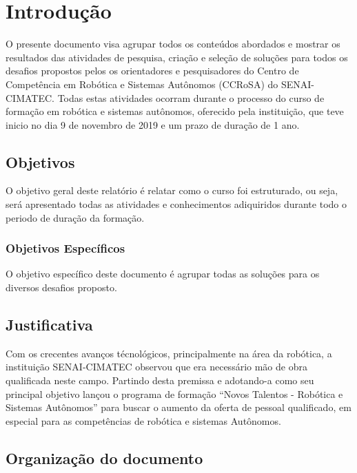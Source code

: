 \chapter{Introdução}
\label{chap:intro}

O presente documento visa agrupar todos os conteúdos abordados e mostrar os resultados das atividades de pesquisa, criação e seleção de soluções para todos os desafios propostos pelos os orientadores e pesquisadores do Centro de Competência em Robótica e Sistemas Autônomos (CCRoSA) do SENAI-CIMATEC. Todas estas atividades ocorram durante o processo do curso de formação em robótica e sistemas autônomos, oferecido pela instituição, que teve inicio no dia 9 de novembro de 2019 e um prazo de duração de 1 ano.



\section{Objetivos}
\label{sec:obj}

O objetivo geral deste relatório é relatar como o curso foi estruturado, ou seja, será apresentado todas as atividades e conhecimentos adiquiridos durante todo o periodo de duração da formação. 


\subsection{Objetivos Específicos}
\label{ssec:objesp}

O objetivo específico deste documento é agrupar todas as soluções para os diversos desafios proposto. 

\section{Justificativa}
\label{sec:justi}

Com os crecentes avanços técnológicos, principalmente na área da robótica, a instituição SENAI-CIMATEC observou que era necessário mão de obra qualificada neste campo. Partindo desta premissa e adotando-a como seu principal objetivo lançou o programa de formação ``Novos Talentos - Robótica e Sistemas Autônomos'' para buscar o aumento da oferta de pessoal qualificado, em especial para as competências de robótica e sistemas Autônomos. 


\section{Organização do documento}
\label{section:organizacao}

